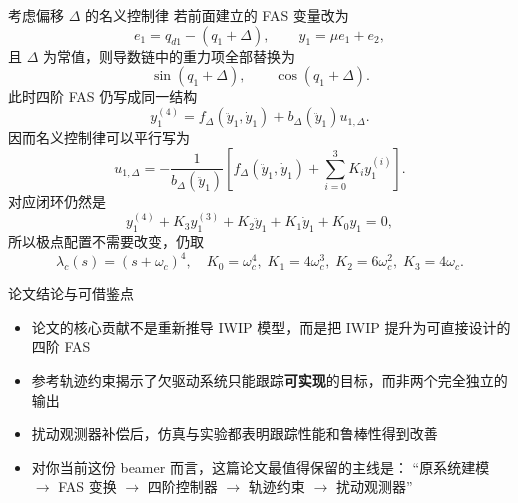 \begin{frame}{考虑偏移 $\Delta$ 的名义控制律}
    \scriptsize
    若前面建立的 FAS 变量改为
    \[
    e_1=q_{d1}-(q_1+\Delta),
    \qquad
    y_1=\mu e_1+e_2,
    \]
    且 $\Delta$ 为常值，则导数链中的重力项全部替换为
    \[
    \sin(q_1+\Delta),\qquad \cos(q_1+\Delta).
    \]
    此时四阶 FAS 仍写成同一结构
    \[
    y_1^{(4)} = f_\Delta(\ddot y_1,\dot y_1) + b_\Delta(\ddot y_1)u_{1,\Delta}.
    \]
    因而名义控制律可以平行写为
    \[
    u_{1,\Delta}
    =
    -\frac{1}{b_\Delta(\ddot y_1)}
    \left[
    f_\Delta(\ddot y_1,\dot y_1)+\sum_{i=0}^{3}K_i y_1^{(i)}
    \right].
    \]
    对应闭环仍然是
    \[
    y_1^{(4)} + K_3 y_1^{(3)} + K_2 \ddot y_1 + K_1 \dot y_1 + K_0 y_1 = 0,
    \]
    所以极点配置不需要改变，仍取
    \[
    \lambda_c(s)=(s+\omega_c)^4,
    \quad
    K_0=\omega_c^4,\;
    K_1=4\omega_c^3,\;
    K_2=6\omega_c^2,\;
    K_3=4\omega_c.
    \]
\end{frame}

\begin{frame}{论文结论与可借鉴点}
    \small
    \begin{itemize}
        \setlength{\itemsep}{0.5em}
        \item 论文的核心贡献不是重新推导 IWIP 模型，而是把 IWIP 提升为可直接设计的四阶 FAS
        \item 参考轨迹约束揭示了欠驱动系统只能跟踪\textbf{可实现}的目标，而非两个完全独立的输出
        \item 扰动观测器补偿后，仿真与实验都表明跟踪性能和鲁棒性得到改善
        \item 对你当前这份 beamer 而言，这篇论文最值得保留的主线是：
        “原系统建模 $\rightarrow$ FAS 变换 $\rightarrow$ 四阶控制器 $\rightarrow$ 轨迹约束 $\rightarrow$ 扰动观测器”
    \end{itemize}
\end{frame}
